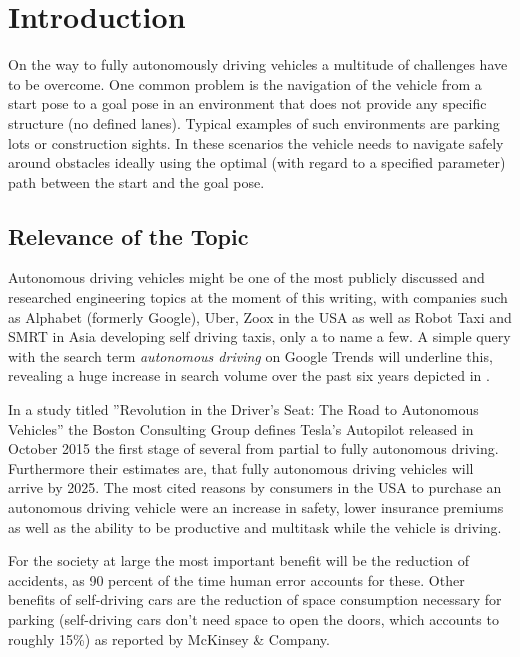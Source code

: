 \chapter{Introduction}
On the way to fully autonomously driving vehicles a multitude of challenges have to be overcome. One common problem is the navigation of the vehicle from a start pose to a goal pose in an environment that does not provide any specific structure (no defined lanes). Typical examples of such environments are parking lots or construction sights. In these scenarios the vehicle needs to navigate safely around obstacles ideally using the optimal (with regard to a specified parameter) path between the start and the goal pose.

\section{Relevance of the Topic}
Autonomous driving vehicles might be one of the most publicly discussed and researched engineering topics at the moment of this writing, with companies such as Alphabet (formerly Google), Uber, Zoox in the USA as well as Robot Taxi and SMRT in Asia developing self driving taxis, only a to name a few. A simple query with the search term \emph{autonomous driving} on Google Trends will underline this, revealing a huge increase in search volume over the past six years depicted in .

In a study titled ''Revolution in the Driver's Seat: The Road to Autonomous Vehicles'' the Boston Consulting Group defines Tesla's Autopilot released in October 2015 the first stage of several from partial to fully autonomous driving. Furthermore their estimates are, that fully autonomous driving vehicles will arrive by 2025. The most cited reasons by consumers in the USA to purchase an autonomous driving vehicle were an increase in safety, lower insurance premiums as well as the ability to be productive and multitask while the vehicle is driving. \cite{Mosquet.2015} 

For the society at large the most important benefit will be the reduction of accidents, as 90 percent of the time human error accounts for these. Other benefits of self-driving cars are the reduction of space consumption necessary for parking (self-driving cars don't need space to open the doors, which accounts to roughly 15\%) as reported by McKinsey \& Company. \cite{Bertoncello.2015}

